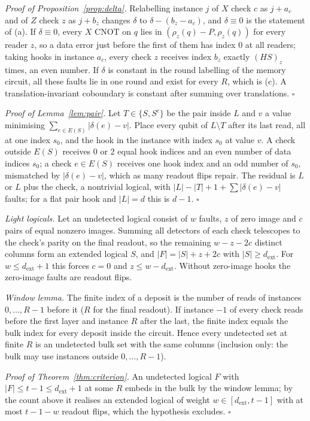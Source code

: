 \documentclass[aps,prl,twocolumn,superscriptaddress,nofootinbib]{revtex4-2}
\newcommand{\dext}{d_{\mathrm{ext}}}
\begin{document}
\emph{Proof of Proposition~\ref{prop:delta}.} Relabelling instance $j$ of $X$ check $c$ as
$j+a_c$ and of $Z$ check $z$ as $j+b_z$ changes $\delta$ to $\delta-(b_z-a_c)$, and
$\delta\equiv0$ is the statement of (a). If $\delta\equiv0$, every $X$ CNOT on $q$ lies in
$(\rho_z(q)-P,\rho_z(q))$ for every reader $z$, so a data error just before the first of them
has index 0 at all readers; taking hooks in instance $a_c$, every check $z$ receives index
$b_z$ exactly $(HS)_z$ times, an even number. If $\delta$ is constant in the round labelling
of the memory circuit, all these faults lie in one round and exist for every $R$, which is
(c). A translation-invariant coboundary is constant after summing over translations.
$\square$

\emph{Proof of Lemma~\ref{lem:pair}.} Let $T\in\{S,S^c\}$ be the pair inside $L$ and $v$ a
value minimising $\sum_{e\in E(S)}|\delta(e)-v|$. Place every qubit of $L\setminus T$ after
its last read, all at one index $s_0$, and the hook in the instance with index $s_0$ at
value $v$. A check outside $E(S)$ receives 0 or 2 equal hook indices and an even number of
data indices $s_0$; a check $e\in E(S)$ receives one hook index and an odd number of $s_0$,
mismatched by $|\delta(e)-v|$, which as many readout flips repair. The residual is $L$ or
$L$ plus the check, a nontrivial logical, with $|L|-|T|+1+\sum|\delta(e)-v|$ faults; for
a flat pair hook and $|L|=d$ this is $d-1$. $\square$

\emph{Light logicals.} Let an undetected logical consist of $w$ faults, $z$ of zero image
and $c$ pairs of equal nonzero images. Summing all detectors of each check telescopes to
the check's parity on the final readout, so the remaining $w-z-2c$ distinct columns form
an extended logical $S$, and $|F|=|S|+z+2c$ with $|S|\ge\dext$. For $w\le\dext+1$ this forces
$c=0$ and $z\le w-\dext$. Without zero-image hooks the zero-image faults are readout flips.

\emph{Window lemma.} The finite index of a deposit is the number of reads of instances
$0,\dots,R-1$ before it ($R$ for the final readout). If instance $-1$ of every check reads
before the first layer and instance $R$ after the last, the finite index equals the bulk
index for every deposit inside the circuit. Hence every undetected set at finite $R$ is an
undetected bulk set with the same columns (inclusion only: the bulk may use instances
outside $0,\dots,R-1$).

\emph{Proof of Theorem~\ref{thm:criterion}.} An undetected logical $F$ with $|F|\le t-1\le
\dext+1$ at some $R$ embeds in the bulk by the window lemma; by the count above it realises
an extended logical of weight $w\in[\dext,t-1]$ with at most $t-1-w$ readout flips, which
the hypothesis excludes. $\square$
\end{document}
